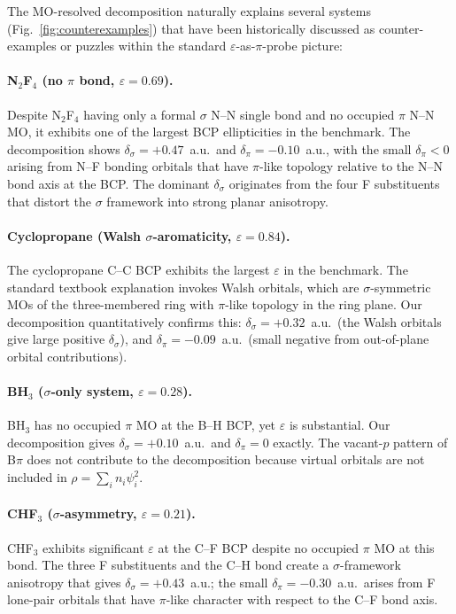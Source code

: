 \documentclass[11pt,a4paper]{article}
\newcommand{\delsg}{\delta_{\sigma}}
\newcommand{\delpi}{\delta_{\pi}}
\newcommand{\eps}{\varepsilon}
\begin{document}
The MO-resolved decomposition naturally explains several systems (Fig.~\ref{fig:counterexamples})
that have been historically discussed as counter-examples or
puzzles within the standard $\eps$-as-$\pi$-probe picture:

\paragraph{N$_2$F$_4$ (no $\pi$ bond, $\eps = 0.69$).}
Despite N$_2$F$_4$ having only a formal $\sigma$ N--N single bond
and no occupied $\pi$ N--N MO, it exhibits one of the largest BCP
ellipticities in the benchmark. The decomposition shows
$\delsg = +0.47$~a.u.\ and $\delpi = -0.10$~a.u., with the small
$\delpi < 0$ arising from N--F bonding orbitals that have $\pi$-like
topology relative to the N--N bond axis at the BCP. The dominant
$\delsg$ originates from the four F substituents that distort the
$\sigma$ framework into strong planar anisotropy.

\paragraph{Cyclopropane (Walsh $\sigma$-aromaticity, $\eps = 0.84$).}
The cyclopropane C--C BCP exhibits the largest $\eps$ in the
benchmark. The standard textbook explanation invokes Walsh
orbitals, which are $\sigma$-symmetric MOs of the three-membered
ring with $\pi$-like topology in the ring plane. Our decomposition
quantitatively confirms this: $\delsg = +0.32$~a.u.\ (the Walsh
orbitals give large positive $\delsg$), and $\delpi = -0.09$~a.u.\
(small negative from out-of-plane orbital contributions).

\paragraph{BH$_3$ ($\sigma$-only system, $\eps = 0.28$).}
BH$_3$ has no occupied $\pi$ MO at the B--H BCP, yet $\eps$ is
substantial. Our decomposition gives $\delsg = +0.10$~a.u.\
and $\delpi = 0$ exactly. The vacant-$p$ pattern of B$\pi$ does not
contribute to the decomposition because virtual orbitals are not
included in $\rho = \sum_i n_i \psi_i^2$.

\paragraph{CHF$_3$ ($\sigma$-asymmetry, $\eps = 0.21$).}
CHF$_3$ exhibits significant $\eps$ at the C--F BCP despite no
occupied $\pi$ MO at this bond. The three F substituents and the
C--H bond create a $\sigma$-framework anisotropy that gives
$\delsg = +0.43$~a.u.; the small $\delpi = -0.30$~a.u.\ arises
from F lone-pair orbitals that have $\pi$-like character with
respect to the C--F bond axis.
\end{document}
